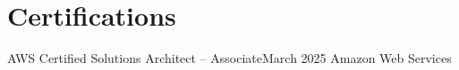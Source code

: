 \section{Certifications}
\resumeSubHeadingListStart
\resumeSubheading
    {AWS Certified Solutions Architect -- Associate}{March 2025}
    {Amazon Web Services}{}
\resumeSubHeadingListEnd
